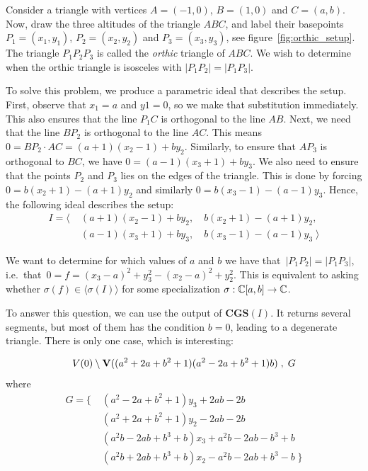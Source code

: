 \begin{example} \upshape
  Consider a triangle with vertices $A = (-1, 0)$, $B = (1, 0)$ and $C = (a, b)$. Now, draw the three altitudes of the triangle $ABC$, and label their basepoints $P_{1} = (x_{1}, y_{1})$, $P_{2} = (x_{2}, y_{2})$ and $P_{3} = (x_{3}, y_{3})$, see figure~\ref{fig:orthic_setup}. The triangle $P_{1}P_{2}P_{3}$ is called the \textit{orthic} triangle of $ABC$. We wish to determine when the orthic triangle is isosceles with $|P_{1}P_{2}| = |P_{1}P_{3}|$.

  To solve this problem, we produce a parametric ideal that describes the setup. First, observe that $x_{1} = a$ and $y1 = 0$, so we make that substitution immediately. This also ensures that the line $P_{1}C$ is orthogonal to the line $AB$. Next, we need that the line $BP_{2}$ is orthogonal to the line $AC$. This means $0 = BP_{2} \cdot AC = (a + 1)(x_{2} - 1) + b y_{2}$. Similarly, to ensure that $AP_{3}$ is orthogonal to $BC$, we have $0 = (a - 1)(x_{3} + 1) + b y_{3}$. We also need to ensure that the points $P_{2}$ and $P_{3}$ lies on the edges of the triangle. This is done by forcing $0 = b(x_{2} + 1) - (a + 1)y_{2}$ and similarly $0 = b(x_{3} - 1) - (a - 1)y_{3}$. Hence, the following ideal describes the setup:
  \begin{align*}
    I = \langle\; &(a + 1)(x_{2} - 1) + b y_{2}, \quad  b(x_{2} + 1) - (a + 1)y_{2}, \\
                  &(a - 1)(x_{3} + 1) + b y_{3}, \quad  b(x_{3} - 1) - (a - 1)y_{3} \; \rangle
  \end{align*}

  We want to determine for which values of $a$ and $b$ we have that $\,|P_{1} P_{2}| = |P_{1} P_{3}|$, i.e.\ that $\,0 = f = (x_{3} - a)^{2} + y_{3}^{2} - (x_{2} - a)^{2} + y_{2}^{2}$. This is equivalent to asking whether $\sigma(f) \in \langle \sigma(I) \rangle$ for some specialization $\sigma : \mathbb{C}[a, b] \to \mathbb{C}$.

  To answer this question, we can use the output of $\mathbf{CGS}(I)$. It returns several segments, but most of them has the condition $b = 0$, leading to a degenerate triangle. There is only one case, which is interesting:

  \[V(0) \setminus \operatorname{\mathbf V}((a^{2} + 2a + b^{2} + 1)(a^{2} - 2a + b^{2} + 1)b)\;, \; G\] where
  \begin{align*}
 G = \{\; &(a^2 - 2a + b^2 + 1)y_3 + 2ab - 2b \\
          &(a^2 + 2a + b^2 + 1)y_2 - 2ab - 2b \\
          &(a^2b - 2ab + b^3 + b)x_3 + a^2b - 2ab - b^3 + b \\
          &(a^2b + 2ab + b^3 + b)x_2 - a^2b - 2ab + b^3 - b \; \}
  \end{align*}


\end{example}
